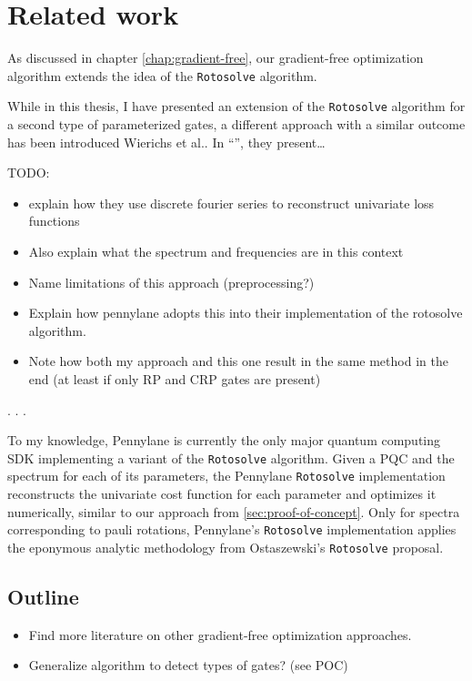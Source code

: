 \chapter{Related work}
\label{chap:related-work}

As discussed in chapter \ref{chap:gradient-free}, our gradient-free optimization
algorithm extends the idea of the \texttt{Rotosolve}
\cite{ostaszewski_structure_2021} algorithm.

While in this thesis, I have presented an extension of the \texttt{Rotosolve}
algorithm for a second type of parameterized gates, a different approach with a
similar outcome has been introduced Wierichs et al..
In ``\emph{}'', they present\dots

TODO:
\begin{itemize}
    \item explain how they use discrete fourier series to reconstruct univariate
        loss functions
    \item Also explain what the spectrum and frequencies are in this context
    \item Name limitations of this approach (preprocessing?)
    \item Explain how pennylane adopts this into their implementation of the
        rotosolve algorithm.
    \item Note how both my approach and this one result in the same method in
        the end (at least if only RP and CRP gates are present)
\end{itemize}. . . 

To my knowledge, Pennylane \cite{bergholm_pennylane_2022} is currently the only
major quantum computing SDK implementing a variant of the \texttt{Rotosolve}
\cite{ostaszewski_structure_2021} algorithm.
Given a PQC and the spectrum for each of its parameters, the Pennylane
\texttt{Rotosolve} implementation reconstructs the univariate cost function for
each parameter and optimizes it numerically, similar to our approach from
\autoref{sec:proof-of-concept}.
Only for spectra corresponding to pauli rotations, Pennylane's
\texttt{Rotosolve} implementation applies the eponymous analytic methodology
from Ostaszewski's \texttt{Rotosolve} proposal.

\section{Outline}
\begin{itemize}
    \item
        Find more literature on other gradient-free optimization
        approaches.
    \item Generalize algorithm to detect types of gates? (see POC)
\end{itemize}